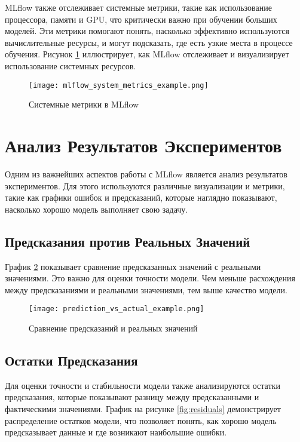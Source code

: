 \documentclass[14pt, a4paper]{src/bsu}
\begin{document}
MLflow также отслеживает системные метрики, такие как использование
процессора, памяти и GPU, что критически важно при обучении больших
моделей. Эти метрики помогают понять, насколько эффективно
используются вычислительные ресурсы, и могут подсказать, где есть
узкие места в процессе обучения. Рисунок
\ref{fig:mlflow_system_metrics} иллюстрирует, как MLflow
отслеживает и визуализирует использование системных ресурсов.

\begin{figure}[h!] \centering
	\texttt{[image: mlflow\_system\_metrics\_example.png]}
	\caption{Системные метрики в MLflow}
	\label{fig:mlflow_system_metrics} \end{figure}

\section{Анализ Результатов Экспериментов}

Одним из важнейших аспектов работы с MLflow является анализ
результатов экспериментов. Для этого используются различные
визуализации и метрики, такие как графики ошибок и предсказаний,
которые наглядно показывают, насколько хорошо модель выполняет свою
задачу.

\subsection{Предсказания против Реальных Значений}

График \ref{fig:prediction_vs_actual} показывает сравнение
предсказанных значений с реальными значениями. Это важно для оценки
точности модели. Чем меньше расхождения между предсказаниями и
реальными значениями, тем выше качество модели.

\begin{figure}[h!] \centering
	\texttt{[image: prediction\_vs\_actual\_example.png]}
	\caption{Сравнение предсказаний и реальных значений}
	\label{fig:prediction_vs_actual} \end{figure}

\subsection{Остатки Предсказания}

Для оценки точности и стабильности модели также анализируются
остатки предсказания, которые показывают разницу между
предсказанными и фактическими значениями. График на рисунке
\ref{fig:residuals} демонстрирует распределение остатков модели,
что позволяет понять, как хорошо модель предсказывает данные и где
возникают наибольшие ошибки.
\end{document}
